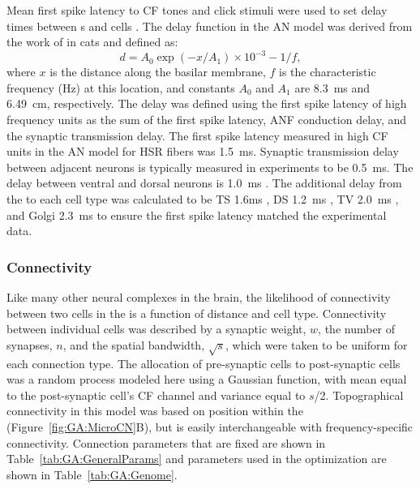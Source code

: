 Mean first spike latency to CF tones and click stimuli were used to
set delay times between {\ANF}s and {\CN} cells
\citep{EagerGraydenEtAl:2006}. The delay function in the AN model was
derived from the work of \citet{CarneyYin:1988} in cats and
defined as:
\begin{equation} \label{eq:GA:delay} 
d=A_{0} \exp(-x/A_{1})\times 10^{- 3} -1/f,
\end{equation}
where $x$ is the distance along the basilar membrane, $f$ is the
characteristic frequency (Hz) at this location, and constants $A_0$
and $A_1$ are 8.3~ms and 6.49~cm, respectively. The delay was defined
using the first spike latency of high frequency units as the sum of
the {\ANF} first spike latency, ANF conduction delay, and the synaptic
transmission delay.  The first spike latency measured in high CF units
in the AN model for HSR fibers was 1.5~ms.  Synaptic transmission
delay between adjacent neurons is typically measured in experiments to
be 0.5~ms. The delay between ventral and dorsal {\CN} neurons is 1.0~ms
\citep{WickesbergOertel:1993}.  The additional delay from the {\ANF} to
each cell type was calculated to be TS 1.6ms \citep{RhodeSmith:1986},
DS 1.2~ms \citep{RhodeOertelEtAl:1983}, TV 2.0~ms
\citep{SpirouDavisEtAl:1999}, and Golgi 2.3~ms
\citep{FerragamoGoldingEtAl:1998a} to ensure the first spike latency
matched the experimental data.

\subsubsection{Connectivity}\label{sec:GA:connectivity}

Like many other neural complexes in the brain, the likelihood of
connectivity between two cells in the {\CN} is a function of distance and
cell type. Connectivity between individual cells was described by a
synaptic weight, $w$, the number of synapses, $n$, and the spatial
bandwidth, $\sqrt{s}$, which were taken to be uniform for each
connection type.  The allocation of pre-synaptic cells to
post-synaptic cells was a random process modeled here using a Gaussian
function, with mean equal to the post-synaptic cell's CF channel and
variance equal to $s$/2. Topographical connectivity in this model was
based on position within the {\CN} (Figure~\ref{fig:GA:MicroCN}B), but is
easily interchangeable with frequency-specific connectivity.
Connection parameters that are fixed are shown in
Table~\ref{tab:GA:GeneralParams} and parameters used in the
optimization are shown in Table~\ref{tab:GA:Genome}.

